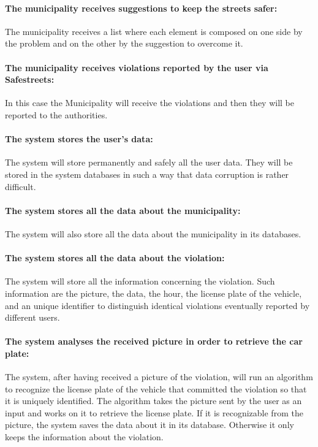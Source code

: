 \documentclass[titlepage]{article}
\begin{document}
\paragraph{The municipality receives suggestions to keep the streets safer: }
The municipality receives a list where each element is composed on one side by the problem and on the other by the suggestion to overcome it.
\paragraph{The municipality receives violations reported by the user via Safestreets:} In this case the Municipality will receive the violations and then they will be reported to the authorities.
\paragraph{The system stores the user's data:}
The system will store permanently and safely all the user data. They will be stored in the system databases in such a way that data corruption is rather difficult.
\paragraph{The system stores all the data about the 					municipality:}
The system will also store all the data about the municipality in its databases.
\paragraph{The system stores all the data about the violation: }
The system will store all the information concerning the violation. Such information are the picture, the data, the hour, the license plate of the vehicle, and an unique identifier to distinguish identical violations eventually reported by different users.
\paragraph{The system analyses the received picture in order to 	retrieve the car plate: }
The system, after having received a picture of the violation, will run an algorithm to recognize the license plate of the vehicle that committed the violation so that it is uniquely identified. The algorithm takes the picture sent by the user as an input and works on it to retrieve the license plate. If it is recognizable from the picture, the system saves the data about it in its database. Otherwise it only keeps the information about the violation.
\end{document}
